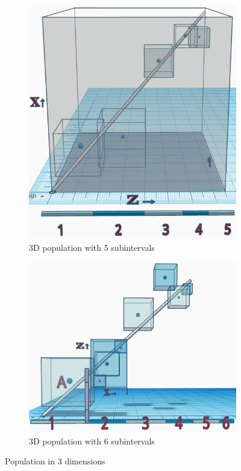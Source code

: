 	\begin{figure}[H]
	\centering
		\begin{subfigure}[H]{0.6\linewidth}
		\centering
		\includegraphics[width=1\linewidth]{sections/images/consciousness_space_3D_plan.jpg}
		\caption{3D population with 5 subintervals}
		\label{fig:consciousness_space_3D_plan}
		\end{subfigure}
	
		\begin{subfigure}[H]{0.6\linewidth}
		\centering
		\includegraphics[width=1\linewidth]{sections/images/consciousness_space_3D_plan_subinterval.jpg}
		\caption{3D population with 6 subintervals}
		\label{fig:consciousness_space_3D_plan_subinterval}
		\end{subfigure}%
	\caption{Population in 3 dimensions}
	\end{figure}
